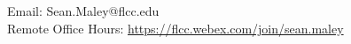 \documentclass[11pt]{article} %
\begin{document}
\begin{center}
	{\small Email: Sean.Maley@flcc.edu\\
	Remote Office Hours: \textcolor{blue}{\url{https://flcc.webex.com/join/sean.maley}}}
	
\end{center}
\end{document}
